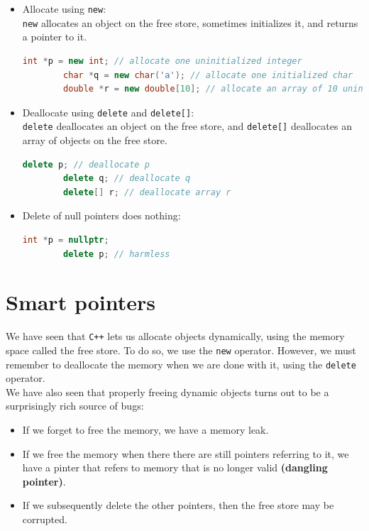 \begin{itemize}
    \item Allocate using \texttt{new}:\\
    \texttt{new} allocates an object on the free store, sometimes initializes it, and returns a pointer to it.

    \begin{lstlisting}[language=C++]
        int *p = new int; // allocate one uninitialized integer
        char *q = new char('a'); // allocate one initialized char
        double *r = new double[10]; // allocate an array of 10 uninitialized doubles
    \end{lstlisting}

    \item Deallocate using \texttt{delete} and \texttt{delete[]}:\\
    \texttt{delete} deallocates an object on the free store, and \texttt{delete[]} deallocates an array of objects on the free store.

    \begin{lstlisting}[language=C++]
        delete p; // deallocate p
        delete q; // deallocate q
        delete[] r; // deallocate array r
    \end{lstlisting}

    \item Delete of null pointers does nothing:
    \begin{lstlisting}[language=C++]
        int *p = nullptr;
        delete p; // harmless
    \end{lstlisting}

\end{itemize}

\section{Smart pointers}

We have seen that \texttt{C++} lets us allocate objects dynamically, using the memory space
called the free store. To do so, we use the \texttt{new} operator. However, we must remember to
deallocate the memory when we are done with it, using the \texttt{delete} operator.\\

We have also seen that properly freeing dynamic objects turns out to be a surprisingly
rich source of bugs:

\begin{itemize}
    \item If we forget to free the memory, we have a memory leak.
    \item If we free the memory when there there are still pointers referring to it, 
    we have a pinter that refers to memory that is no longer valid \textbf{(dangling pointer)}.
    \item If we subsequently delete the other pointers, then the free store may be 
    corrupted.
\end{itemize}

